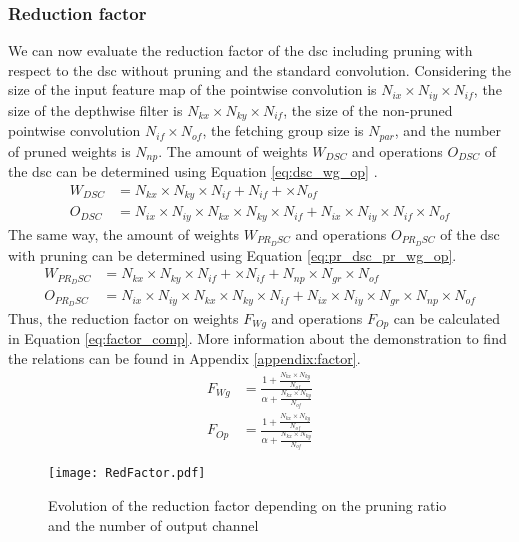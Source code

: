 \subsubsection{Reduction factor}
%
We can now evaluate the reduction factor of the \acrshort{dsc} including pruning with respect to the \acrshort{dsc} without pruning and the standard convolution. Considering the size of the input feature map of the pointwise convolution is $N_{ix}  \times N_{iy} \times N_{if}$, the size of the depthwise filter is $N_{kx} \times N_{ky} \times N_{if}$, the size of the non-pruned pointwise convolution $N_{if} \times N_{of}$, the fetching group size is $N_{par}$, and the number of pruned weights is $N_{np}$. The amount of weights $W_{DSC}$ and operations $O_{DSC}$ of the \acrshort{dsc} can be determined using Equation \eqref{eq:dsc_wg_op} \cite{bai_cnn_2018, liu_fpga-based_2019}.
%
\begin{align}
    W_{DSC} &= N_{kx} \times N_{ky} \times N_{if} + N_{if} + \times N_{of}\\
    O_{DSC} &= N_{ix} \times N_{iy} \times N_{kx} \times N_{ky} \times N_{if} + N_{ix} \times N_{iy} \times N_{if} \times N_{of}
    \label{eq:dsc_wg_op}
\end{align}
%
The same way, the amount of weights $W_{PR_DSC}$ and operations $O_{PR_DSC}$ of the \acrshort{dsc} with pruning can be determined using Equation \eqref{eq:pr_dsc_pr_wg_op}.
%
\begin{align}
    W_{PR_DSC} &= N_{kx} \times N_{ky} \times N_{if} + \times N_{if} + N_{np} \times N_{gr} \times N_{of}\\
    O_{PR_DSC} &= N_{ix} \times N_{iy} \times N_{kx} \times N_{ky} \times N_{if} + N_{ix} \times N_{iy} \times N_{gr} \times N_{np} \times N_{of} 
    \label{eq:pr_dsc_wg_op}
\end{align}
%
Thus, the reduction factor on weights $F_{Wg}$ and operations $F_{Op}$ can be calculated in Equation \eqref{eq:factor_comp}. More information about the demonstration to find the relations can be found in Appendix \ref{appendix:factor}.
%
\begin{align}
    F_{Wg} &= \frac{1 + \frac{N_{kx} \times N_{ky}} {N_{of}}} {\alpha + \frac{N_{kx} \times N_{ky}} {N_{of}}}\\
    F_{Op} &= \frac{1 + \frac{N_{kx} \times N_{ky}} {N_{of}}} {\alpha + \frac{N_{kx} \times N_{ky}} {N_{of}}}
    \label{eq:factor_comp}
\end{align}
%
\begin{figure}
    \centering
    \texttt{[image: RedFactor.pdf]}
    \caption{Evolution of the reduction factor depending on the pruning ratio and the number of output channel}
    \label{fig:redfacto}
\end{figure}
